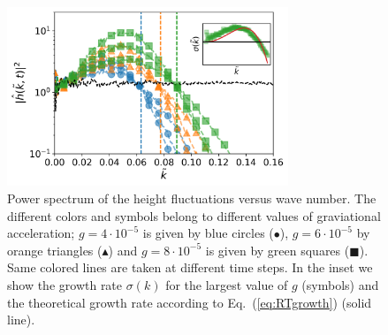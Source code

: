 \begin{figure}
    \centering
    \includegraphics[width=0.75\textwidth]{graphics/Fig_3_new_RTI_spectra_single_color_same_tau_capkc_correct_rescaled_x_axis_inset.png}
    \caption{Power spectrum of the height fluctuations versus wave number. The different colors and symbols belong to different values of graviational acceleration; $g=4\cdot 10^{-5}$ is given by blue circles (\textcolor{pyblue}{$\bullet$}), $g=6\cdot 10^{-5}$ by orange triangles (\textcolor{pyorange}{$\blacktriangle$}) and $g=8\cdot 10^{-5}$ is given by green squares (\textcolor{pygreen}{$\blacksquare$}). Same colored lines are taken at different time steps. In the inset we show the growth rate $\sigma(k)$ for the largest value of $g$ (symbols) and the theoretical growth rate according to Eq.~(\ref{eq:RTgrowth}) (solid line).}
    \label{fig:RTI}
\end{figure}

